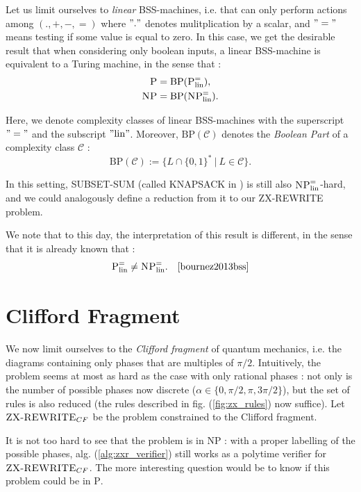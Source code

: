 \documentclass[journal,onecolumn]{IEEEtran}
\begin{document}
Let us limit ourselves to \textit{linear} BSS-machines, i.e. that can only perform actions among $(., +, -, =)$ where $"."$ denotes mulitplication by a scalar, and $"="$ means testing if some value is equal to zero. In this case, we get the desirable result that when considering only boolean inputs, a linear BSS-machine is equivalent to a Turing machine, in the sense that :
$$
\begin{aligned}
	\textsc{P} &= \text{BP}(\textsc{P}^=_\text{lin}),\\
	\textsc{NP} &= \text{BP}(\textsc{NP}^{=}_\text{lin}).
\end{aligned}
$$ 

Here, we denote complexity classes of linear BSS-machines with the superscript $"="$ and the subscript $"\text{lin}"$. Moreover, $\text{BP}(\mathcal{C})$ denotes the  \textit{Boolean Part} of a complexity class $\mathcal{C}$ :
$$
\text{BP}(\mathcal{C}) := \{L \cap \{0, 1\}^* \: | \: L \in \mathcal{C}\}.
$$

In this setting, \textsc{SUBSET-SUM} (called \textsc{KNAPSACK} in \cite{bournez2013bss}) is still also $\textsc{NP}^{=}_\text{lin}$-hard, and we could analogously define a reduction from it to our \textsc{ZX-REWRITE} problem.

We note that to this day, the interpretation of this result is different, in the sense that it is already known that :
$$
\textsc{P}^=_\text{lin} \neq \textsc{NP}^{=}_\text{lin}. \quad \cite{bournez2013bss}
$$ 

\section{Clifford Fragment}

We now limit ourselves to the \textit{Clifford fragment} of quantum mechanics, i.e. the diagrams containing only phases that are multiples of $\pi / 2$. Intuitively, the problem seems at most as hard as the case with only rational phases : not only is the number of possible phases now discrete ($\alpha \in \{0, \pi / 2, \pi, 3 \pi / 2\}$), but the set of rules is also reduced (the rules described in fig. (\ref{fig:zx_rules}) now suffice). Let $\textsc{ZX-REWRITE}_{CF}$ be the problem constrained to the Clifford fragment.

It is not too hard to see that the problem is in \textsc{NP} : with a proper labelling of the possible phases, alg. (\ref{alg:zxr_verifier}) still works as a polytime verifier for $\textsc{ZX-REWRITE}_{CF}$. The more interesting question would be to know if this problem could be in \textsc{P}.
\end{document}
